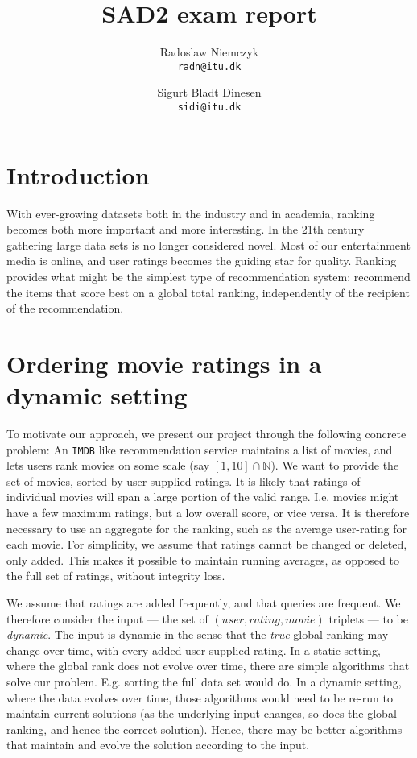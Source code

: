 \documentclass[a4paper, titlepage]{report}
\renewcommand{\%}{\scalebox{.9}{\oldpct}}
\begin{document}
\setcounter{chapter}{1}

\title{SAD2 exam report}
\author{
	Radoslaw Niemczyk
	\\\texttt{radn@itu.dk}
	\and
	Sigurt Bladt Dinesen
	\\\texttt{sidi@itu.dk}
}

\maketitle

\section{Introduction}
With ever-growing datasets both in the industry and in academia, ranking becomes
both more important and more interesting. In the 21th century gathering large
data sets is no longer considered novel. Most of our entertainment media is
online, and user ratings becomes the guiding star for quality. Ranking provides
what might be the simplest type of recommendation system: recommend the items
that score best on a global total ranking, independently of the recipient of the
recommendation.

\section{Ordering movie ratings in a dynamic setting}
\label{sec:intro_real}
To motivate our approach, we present our project through the following concrete
problem: An \texttt{IMDB} like recommendation service maintains a list of
movies, and lets users rank movies on some scale (say $\left[1,10\right]\cap
\mathbb{N}$). We want to provide the set of movies, sorted by user-supplied
ratings. It is likely that ratings of individual movies will span a large
portion of the valid range. I.e. movies might have a few maximum ratings, but
a low overall score, or vice versa. It is therefore necessary to use an
aggregate for the ranking, such as the average user-rating for each movie. For
simplicity, we assume that ratings cannot be changed or deleted, only added.
This makes it possible to maintain running averages, as opposed to the full set
of ratings, without integrity loss.

We assume that ratings are added frequently, and that queries are frequent. We
therefore consider the input --- the set of $(user, rating, movie)$ triplets ---
to be \textit{dynamic}. The input is dynamic in the sense that the \textit{true}
global ranking may change over time, with every added user-supplied rating. In a
static setting, where the global rank does not evolve over time, there are
simple algorithms that solve our problem. E.g. sorting the full data set would
do.
In a dynamic setting, where the data evolves over time,
those algorithms would need to be re-run to maintain current solutions (as the
underlying input changes, so does the global ranking, and hence the correct
solution). Hence, there may be better algorithms that maintain and evolve the
solution according to the input.
\end{document}
